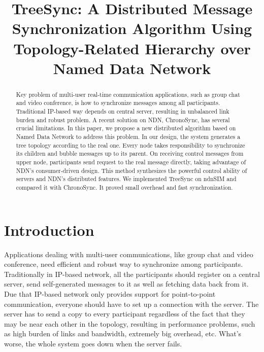 \documentclass[conference]{IEEEtran}
\begin{document}
\title{TreeSync: A Distributed Message Synchronization Algorithm Using Topology-Related Hierarchy over Named Data Network}
\maketitle


\begin{abstract}
Key problem of multi-user real-time communication applications,
such as group chat and video conference,
is how to synchronize messages among all participants.
Traditional IP-based way depends on central server, resulting in unbalanced link burden and robust problem.
A recent solution on NDN, ChronoSync, has several crucial limitations.
In this paper, we propose a new distributed algorithm based on Named Data Network to address this problem.
In our design, the system generates a tree topology according to the real one.
Every node takes responsibility to synchronize its children and bubble messages up to its parent.
On receiving control messages from upper node,
participants send request to the real message directly, taking advantage of NDN's consumer-driven design.
This method synthesizes the powerful control ability of servers and NDN's distributed features.
We implemented TreeSync on ndnSIM and compared it with ChronoSync.
It proved small overhead and fast synchronization.
\end{abstract}

\IEEEpeerreviewmaketitle

\section{Introduction}

Applications dealing with multi-user communications,
like group chat and video conference,
need efficient and robust way to synchronize among participants.
Traditionally in IP-based network,
all the participants should register on a central server,
send self-generated messages to it as well as fetching data back from it.
Due that IP-based network only provides support for point-to-point communication,
everyone should have to set up a connection with the server.
The server has to send a copy to every participant regardless of the fact that
they may be near each other in the topology,
resulting in performance problems, such as high burden of links and bandwidth,
extremely big overhead, etc.
What's worse, the whole system goes down when the server fails.
\end{document}
